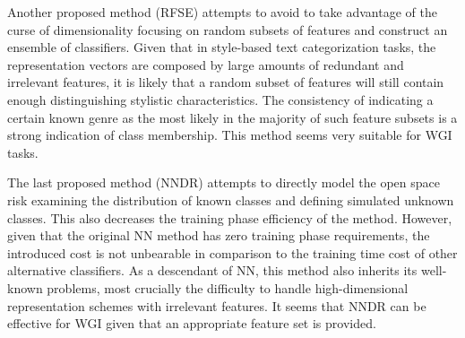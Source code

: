 Another proposed method (RFSE) attempts to avoid to take advantage of the curse of dimensionality focusing on random subsets of features and construct an ensemble of classifiers. Given that in style-based text categorization tasks, the representation vectors are composed by large amounts of redundant and irrelevant features, it is likely that a random subset of features will still contain enough distinguishing stylistic characteristics. The consistency of indicating a certain known genre as the most likely in the majority of such feature subsets is a strong indication of class membership. This method seems very suitable for WGI tasks. 

The last proposed method (NNDR) attempts to directly model the open space risk examining the distribution of known classes and defining simulated unknown classes. This also decreases the training phase efficiency of the method. However, given that the original NN method has zero training phase requirements, the introduced cost is not unbearable in comparison to the training time cost of other alternative classifiers. As a descendant of NN, this method also inherits its well-known problems, most crucially the difficulty to handle high-dimensional representation schemes with irrelevant features. It seems that NNDR can be effective for WGI given that an appropriate feature set is provided.